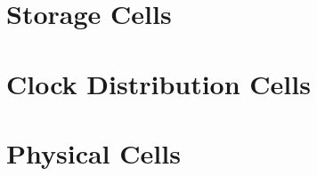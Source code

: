


\chapter{Storage Cells}





\chapter{Clock Distribution Cells}





\chapter{Physical Cells}









